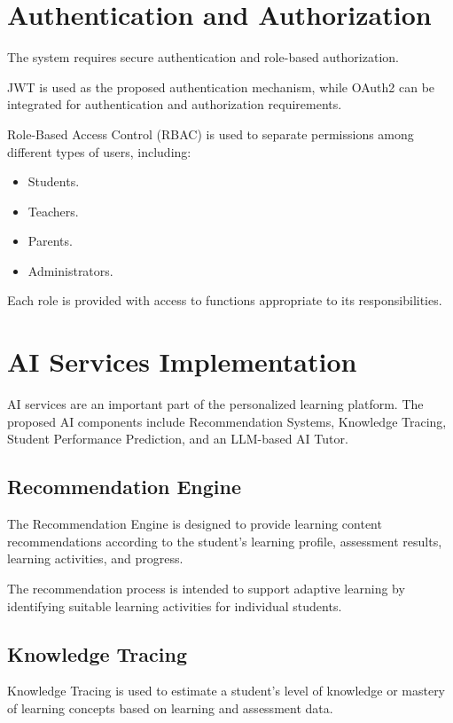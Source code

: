 \section{Authentication and Authorization}

The system requires secure authentication and role-based authorization.

JWT is used as the proposed authentication mechanism, while OAuth2 can be integrated for authentication and authorization requirements.

Role-Based Access Control (RBAC) is used to separate permissions among different types of users, including:

\begin{itemize}
	\item Students.
	\item Teachers.
	\item Parents.
	\item Administrators.
\end{itemize}

Each role is provided with access to functions appropriate to its responsibilities.

\section{AI Services Implementation}

AI services are an important part of the personalized learning platform. The proposed AI components include Recommendation Systems, Knowledge Tracing, Student Performance Prediction, and an LLM-based AI Tutor.

\subsection{Recommendation Engine}

The Recommendation Engine is designed to provide learning content recommendations according to the student's learning profile, assessment results, learning activities, and progress.

The recommendation process is intended to support adaptive learning by identifying suitable learning activities for individual students.

\subsection{Knowledge Tracing}

Knowledge Tracing is used to estimate a student's level of knowledge or mastery of learning concepts based on learning and assessment data.


